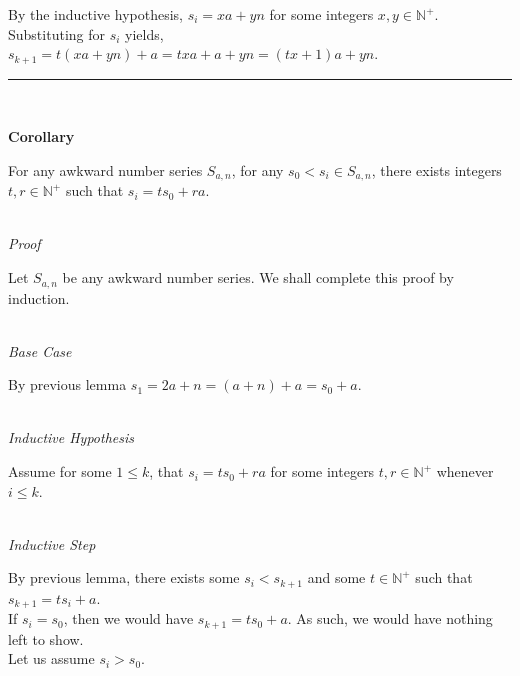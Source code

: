 \documentclass[a4paper,12pt]{article}
\begin{document}
\noindent By the inductive hypothesis, $s_i = xa + yn$ for some integers $x, y \in \mathbb{N}^+$.\\

\noindent Substituting for $s_i$ yields, $s_{k+1} = t(xa + yn) + a = txa + a + yn = (tx + 1)a + yn$.\\



\begin{center}
\noindent\rule{8cm}{0.4pt}
\end{center}
\noindent \\







\label{corollary:relation_to_initial}
\hypertarget{corollary:relation_to_initial}{}
\begin{tcolorbox}
\textbf{Corollary}

For any awkward number series $S_{a,n}$, for any $s_0 < s_i \in S_{a,n}$, there exists integers $t, r \in \mathbb{N}^+$ such that $s_i = ts_0 + ra$.

\end{tcolorbox}


\noindent \\
\textit{Proof}

\noindent Let $S_{a, n}$ be any awkward number series. We shall complete this proof by induction.


\noindent \\
\textit{Base Case}

\noindent By previous lemma $s_1 = 2a + n = (a + n) + a = s_0 + a$.


\noindent \\
\textit{Inductive Hypothesis}

\noindent Assume for some $1 \leq k$, that $s_i = ts_0 + ra$ for some integers $t, r \in \mathbb{N}^+$ whenever $i \leq k$.


\noindent  \\
\textit{Inductive Step}

\noindent By previous lemma, there exists some $s_i < s_{k+1}$ and some $t \in \mathbb{N}^+$ such that $s_{k+1} = ts_i + a$.\\


\noindent If $s_i = s_0$, then we would have $s_{k+1} = ts_0 + a$. As such, we would have nothing left to show.\\

\noindent Let us assume $s_i > s_0$.\\
\end{document}
